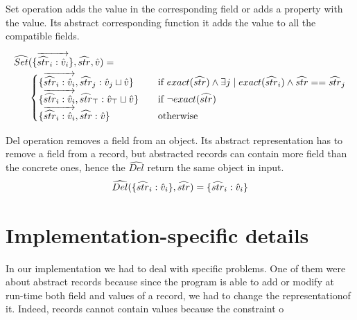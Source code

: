 Set operation adds the value in the corresponding field or adds a property with the value. Its abstract corresponding function it adds the value to all the compatible fields.

\begin{align*}
\widehat{Set}&(\{\overrightarrow{\widehat{str}_i: \hat{v}_i}\}, \widehat{str}, \hat{v}) = \\
&
\begin{cases}
\{\overrightarrow{\widehat{str}_i: \hat{v}_i}, \widehat{str}_j: \hat{v}_j\sqcup\hat{v}\} & \quad\text{if}\ exact(\widehat{str}) \wedge \exists j \mid exact(\widehat{str}_i) \wedge \widehat{str} == \widehat{str}_j\\
\{\overrightarrow{\widehat{str}_i: \hat{v}_i}, \widehat{str}_{\top}: \hat{v}_{\top} \sqcup \hat{v}\} & \quad\text{if}\ \neg exact(\widehat{str})\\
\{\overrightarrow{\widehat{str}_i: \hat{v}_i}, \widehat{str}: \hat{v}\} & \quad\text{otherwise}\\
\end{cases}
\end{align*}

Del operation removes a field from an object. Its abstract representation has to remove a field from a record, but abstracted records can contain more field than the concrete ones, hence the $\widehat{Del}$ return the same object in input.
\begin{align*}
\widehat{Del}(\{\widehat{str}_i: \hat{v}_i\}, \widehat{str}) = \{\widehat{str}_i: \hat{v}_i\}
\end{align*}


\section{Implementation-specific details}
\label{sec:ImplSpecDetails}
In our implementation we had to deal with specific problems. One of them were about abstract records because since the program is able to add or modify at run-time both field and values of a record, we had to change the representationof it. Indeed, records cannot contain values because the constraint o